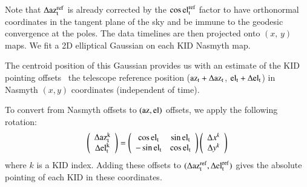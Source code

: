 Note that $\Delta\rm{az}_t^{\rm{ref}}$ is already corrected by the $\cos\rm{el}_t^{\rm{ref}}$ factor to
have orthonormal coordinates in the tangent plane of the sky and be immune to
the geodesic convergence at the poles.
The data timelines are then projected onto $(x,\, y)$ maps. 
We fit a 2D elliptical Gaussian on each KID Nasmyth map. {\lp The centroid
position of this Gaussian provides us with an estimate of the KID
pointing offsets \wrt\ the telescope reference position
($\rm{az}_t+\Delta\rm{az}_t$, $\rm{el}_t+\Delta\rm{el}_t$) in Nasmyth
$(x,y)$ coordinates (independent of time).

To convert from Nasmyth offsets to $(\rm{az},\rm{el})$ offsets, we apply the
following rotation:
%
%
\begin{equation}
\left( {\begin{array}{c}
\Delta \rm{az}^k_t\\
\Delta \rm{el}^k_t\\
\end{array}} \right) = 
\left( {\begin{array}{cc}
\cos\rm{el}_t & \sin\rm{el}_t  \\
-\sin \rm{el}_t & \cos \rm{el}_t \\
\end{array}} \right)
\left( {\begin{array}{c}
\Delta x^k\\
\Delta y^k\\
\end{array}} \right)
\end{equation}
%
where $k$ is a KID index. Adding these offsets to
$(\Delta \rm{az}_t^{\rm{ref}}, \Delta \rm{el}_t^{\rm{ref}})$ gives the
absolute pointing of each KID in these coordinates.}

